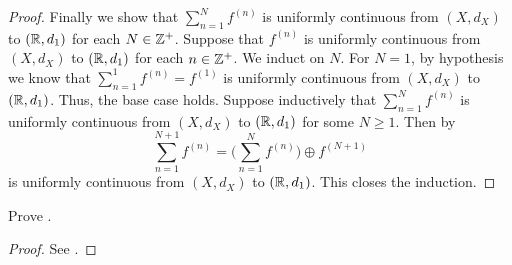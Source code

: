 \begin{proof}
  Finally we show that \(\sum_{n = 1}^N f^{(n)}\) is uniformly continuous from \((X, d_X)\) to \((\mathbb{R}, d_1)\) for each \(N \in \mathbb{Z}^+\).
  Suppose that \(f^{(n)}\) is uniformly continuous from \((X, d_X)\) to \((\mathbb{R}, d_1)\) for each \(n \in \mathbb{Z}^+\).
  We induct on \(N\).
  For \(N = 1\), by hypothesis we know that \(\sum_{n = 1}^1 f^{(n)} = f^{(1)}\) is uniformly continuous from \((X, d_X)\) to \((\mathbb{R}, d_1)\).
  Thus, the base case holds.
  Suppose inductively that \(\sum_{n = 1}^N f^{(n)}\) is uniformly continuous from \((X, d_X)\) to \((\mathbb{R}, d_1)\) for some \(N \geq 1\).
  Then by 
  \[
    \sum_{n = 1}^{N + 1} f^{(n)} = \bigg(\sum_{n = 1}^N f^{(n)}\bigg) \oplus f^{(N + 1)}
  \]
  is uniformly continuous from \((X, d_X)\) to \((\mathbb{R}, d_1)\).
  This closes the induction.
\end{proof}

\begin{ex}\label{ii:ex:3.5.2}
  Prove .
\end{ex}

\begin{proof}
  See .
\end{proof}
